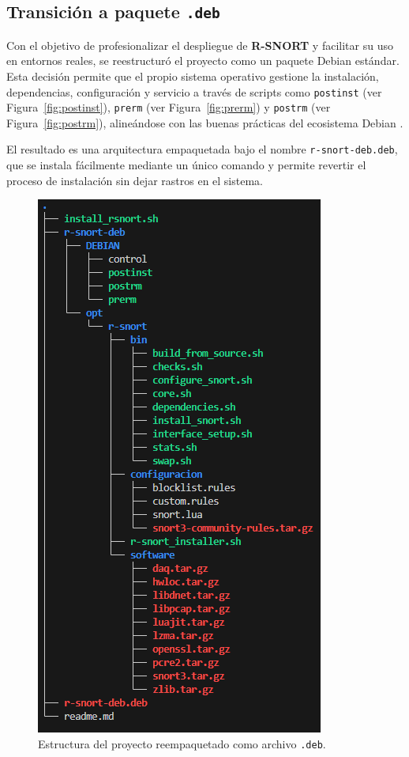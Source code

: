 \documentclass[11pt,a4paper,twoside]{report}
\begin{document}

\subsection{Transición a paquete \texttt{.deb}}

Con el objetivo de profesionalizar el despliegue de \textbf{R-SNORT} y facilitar su uso en entornos reales, se reestructuró el proyecto como un paquete Debian estándar. Esta decisión permite que el propio sistema operativo gestione la instalación, dependencias, configuración y servicio a través de scripts como \texttt{postinst} (ver Figura~\ref{fig:postinst}), \texttt{prerm} (ver Figura~\ref{fig:prerm}) y \texttt{postrm} (ver Figura~\ref{fig:postrm}), alineándose con las buenas prácticas del ecosistema Debian \cite{debian_packaging_guide}.
\newline

El resultado es una arquitectura empaquetada bajo el nombre \texttt{r-snort-deb.deb}, que se instala fácilmente mediante un único comando y permite revertir el proceso de instalación sin dejar rastros en el sistema.

\begin{figure}[H]
	\centering
	\includegraphics[scale=0.8]{script_automatico/13.png}
	\caption{Estructura del proyecto reempaquetado como archivo \texttt{.deb}.}
\end{figure}
\end{document}
